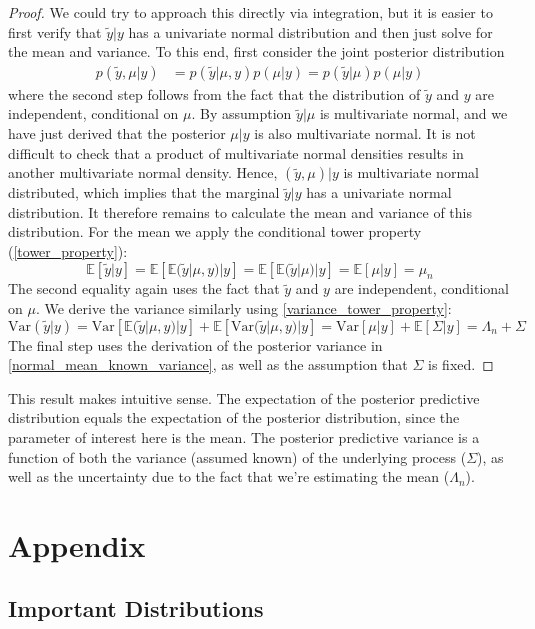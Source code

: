 \documentclass[12pt]{article}
\newcommand{\E}{\mathbb{E}}
\newcommand{\Var}{\mathrm{Var}}
\begin{document}
\begin{proof}
We could try to approach this directly via integration, but it is easier to first verify that $\tilde{y}|y$ has a univariate normal distribution and then just solve for the mean and variance. 
To this end, first consider the joint posterior distribution
\begin{align*}
p(\tilde{y}, \mu|y) &= p(\tilde{y}|\mu, y)p(\mu|y) = p(\tilde{y}|\mu)p(\mu|y)
\end{align*}
where the second step follows from the fact that the distribution of $\tilde{y}$ and $y$ are independent, conditional on $\mu$. By assumption $\tilde{y}|\mu$ is multivariate normal, and we have
just derived that the posterior $\mu|y$ is also multivariate normal. It is not difficult to check that a product of multivariate normal densities results in another multivariate normal density. Hence, 
$(\tilde{y}, \mu)|y$ is multivariate normal distributed, which implies that the marginal $\tilde{y}|y$ has a univariate normal distribution. It therefore remains to calculate the mean and variance of this
distribution. For the mean we apply the conditional tower property (\ref{tower_property}): 
\[\E[\tilde{y}|y] = \E[\E(\tilde{y}|\mu, y)|y] = \E[\E(\tilde{y}|\mu)|y] = \E[\mu|y] = \mu_n\]
The second equality again uses the fact that $\tilde{y}$ and $y$ are independent, conditional on $\mu$. We derive the variance similarly using \ref{variance_tower_property}: 
\[\Var(\tilde{y}|y) = \Var[\E(\tilde{y}|\mu, y)|y] + \E[\Var(\tilde{y}|\mu, y)|y] = \Var[\mu|y] + \E[\Sigma|y] = \Lambda_n + \Sigma\]
The final step uses the derivation of the posterior variance in \ref{normal_mean_known_variance}, as well as the assumption that $\Sigma$ is fixed. 
\end{proof}
This result makes intuitive sense. The expectation of the posterior predictive distribution equals the expectation of the posterior distribution, since the parameter of interest here is the mean. 
The posterior predictive variance is a function of both the variance (assumed known) of the underlying process ($\Sigma$), as well as the uncertainty due to the fact that we're estimating the 
mean ($\Lambda_n$). 

\section{Appendix}

\subsection{Important Distributions}
\end{document}

